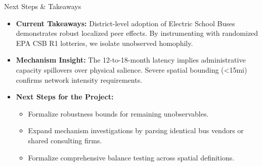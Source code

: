 \documentclass[aspectratio=169]{beamer}
\begin{document}
\begin{frame}{Next Steps \& Takeaways}
    \begin{itemize}
        \item \textbf{Current Takeaways:} District-level adoption of Electric School Buses demonstrates robust localized peer effects. By instrumenting with randomized EPA CSB R1 lotteries, we isolate unobserved homophily.
        \item \textbf{Mechanism Insight:} The 12-to-18-month latency implies administrative capacity spillovers over physical salience. Severe spatial bounding (<15mi) confirms network intensity requirements.
        \item \textbf{Next Steps for the Project:} 
        \begin{itemize}
            \item Formalize robustness bounds for remaining unobservables.
            \item Expand mechanism investigations by parsing identical bus vendors or shared consulting firms.
            \item Formalize comprehensive balance testing across spatial definitions.
        \end{itemize}
    \end{itemize}
\end{frame}
\end{document}
